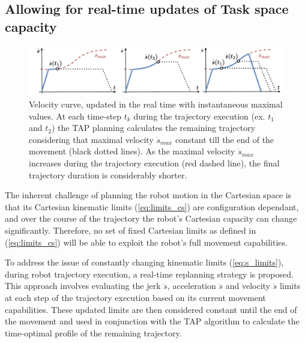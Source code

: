 \subsection{Allowing for real-time updates of Task space capacity}
\label{ch:update_cap}


\begin{figure}[t]
    \centering
    \includegraphics[width=\linewidth]{Papers/imgs/tap_replanning3.pdf}
    \caption{Velocity curve, updated in the real time with instantaneous maximal values. At each time-step $t_k$ during the trajectory execution (ex. $t_1$ and $t_2$) the TAP planning calculates the remaining trajectory considering that maximal velocity $\dot{s}_{max}$ constant till the end of the movement (black dotted lines). As the maximal velocity $\dot{s}_{max}$ increases during the trajectory execution (red dashed line), the final trajectory duration is considerably shorter. }
    \label{fig:replanning}
\end{figure}

The inherent challenge of planning the robot motion in the Cartesian space is that its Cartesian kinematic limits (\ref{eq:limits_cs}) are configuration dependant, and over the course of the trajectory the robot's Cartesian capacity can change significantly. Therefore, no set of fixed Cartesian limits as defined in (\ref{eq:limits_cs}) will be able to exploit the robot's full movement capabilities.  

To address the issue of constantly changing kinematic limits (\ref{eq:s_limits}), during robot trajectory execution, a real-time replanning strategy is proposed. This approach involves evaluating the jerk $\dddot{s}$, acceleration $\ddot{s}$ and velocity $\dot{s}$ limits at each step of the trajectory execution based on its current movement capabilities. These updated limits are then considered constant until the end of the movement and used in conjunction with the TAP algorithm to calculate the time-optimal profile of the remaining trajectory.  


